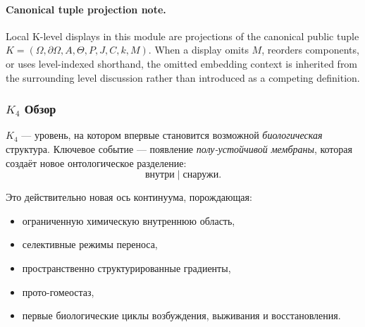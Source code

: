 



\paragraph{Canonical tuple projection note.}
Local K-level displays in this module are projections of the canonical public tuple \(K=(\Omega,\partial\Omega,A,\Theta,P,J,C,k,M)\). When a display omits \(M\), reorders components, or uses level-indexed shorthand, the omitted embedding context is inherited from the surrounding level discussion rather than introduced as a competing definition.

\subsubsection{\texorpdfstring{$K_4$}{K_4} Обзор}
\label{sec:k4-overview}

$K_4$ — уровень, на котором впервые становится возможной
\emph{биологическая} структура. Ключевое событие — появление
\emph{полу-устойчивой мембраны}, которая создаёт новое онтологическое
разделение:
\[
\text{внутри} \;|\; \text{снаружи}.
\]

Это действительно новая ось континуума, порождающая:
\begin{itemize}
    \item ограниченную химическую внутреннюю область,
    \item селективные режимы переноса,
    \item пространственно структурированные градиенты,
    \item прото-гомеостаз,
    \item первые биологические циклы возбуждения, выживания и восстановления.
\end{itemize}

